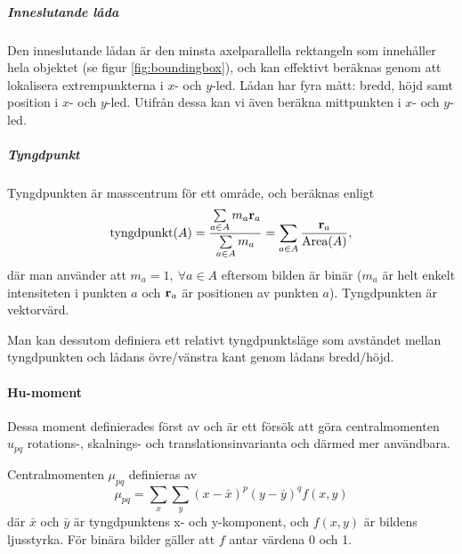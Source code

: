 \documentclass[../rapport_MVEX01-11-05]{subfiles}
\begin{document}
\subparagraph{Inneslutande låda}

Den inneslutande lådan är den minsta axelparallella rektangeln som innehåller hela
objektet (se figur \vref{fig:boundingbox}),
och kan effektivt beräknas genom att lokalisera
extrempunkterna i $x$- och $y$-led. Lådan har fyra mått: bredd, höjd samt
position i $x$- och $y$-led. Utifrån dessa kan vi även beräkna
mittpunkten i $x$- och $y$-led.

\subparagraph{Tyngdpunkt}

Tyngdpunkten är masscentrum för ett område, och beräknas enligt
\begin{equation*}
  \textrm{tyngdpunkt}(A) = \frac{
    \sum\limits_{a\in A}m_a\mathbf{r}_a
  }{
    \sum\limits_{a\in A}m_a
  } =
  \sum\limits_{a\in
  A}\frac{\mathbf{r}_a}{\textrm{Area}(A)},
\end{equation*}
där man använder att $m_a=1,\:\forall a\in A$ eftersom bilden är
binär ($m_a$ är helt enkelt intensiteten i punkten $a$ och
$\mathbf{r}_a$ är positionen av punkten $a$). Tyngdpunkten är vektorvärd.

Man kan dessutom definiera ett relativt tyngdpunktsläge  som avståndet mellan 
tyngdpunkten och lådans övre/vänstra kant genom lådans bredd/höjd.

\paragraph{Hu-moment}

Dessa moment definierades först av  och är ett försök att
göra centralmomenten $u_{pq}$ rotations-, skalnings- och translationsinvarianta och
därmed mer användbara. 

Centralmomenten $\mu_{pq}$ definieras av
\begin{equation*}
	\mu_{pq} = \sum\limits_x\sum\limits_y
	           \left(x-\bar{x}\right)^p
	           \left(y-\bar{y}\right)^q
	           f(x,y)
\end{equation*}
där $\bar{x}$ och $\bar{y}$ är tyngdpunktens x- och y-komponent, och $f(x,y)$ är
bildens ljusstyrka. För binära bilder gäller att
$f$ antar värdena 0 och 1.
\end{document}
